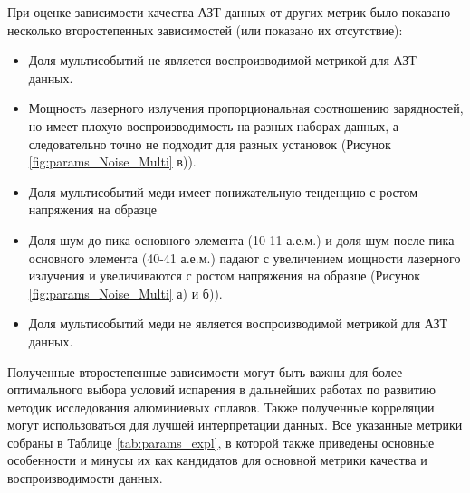 При оценке зависимости качества АЗТ данных от других метрик было показано несколько второстепенных зависимостей (или показано их отсутствие):

\begin{itemize}
	\item Доля мультисобытий не является воспроизводимой метрикой для АЗТ данных.
	\item Мощность лазерного излучения пропорциональная соотношению зарядностей, но имеет плохую воспроизводимость на разных наборах данных, а следовательно точно не подходит для разных установок (Рисунок \cref{fig:params_Noise_Multi} в)).	
	\item Доля мультисобытий меди имеет понижательную тенденцию с ростом напряжения на образце
	\item Доля шум до пика основного элемента (10-11 а.е.м.) и доля шум после пика основного элемента (40-41 а.е.м.)	падают с увеличением мощности лазерного излучения и увеличиваются с ростом напряжения на образце (Рисунок \cref{fig:params_Noise_Multi} а) и б)).
	\item Доля мультисобытий меди не является воспроизводимой метрикой для АЗТ данных.	
\end{itemize}

Полученные второстепенные зависимости могут быть важны для более оптимального выбора условий испарения в дальнейших работах по развитию методик исследования алюминиевых сплавов. Также полученные корреляции могут использоваться для лучшей интерпретации данных. Все указанные метрики собраны в Таблице \cref{tab:params_expl}, в которой также приведены основные особенности и минусы их как кандидатов для основной метрики качества и воспроизводимости данных.


